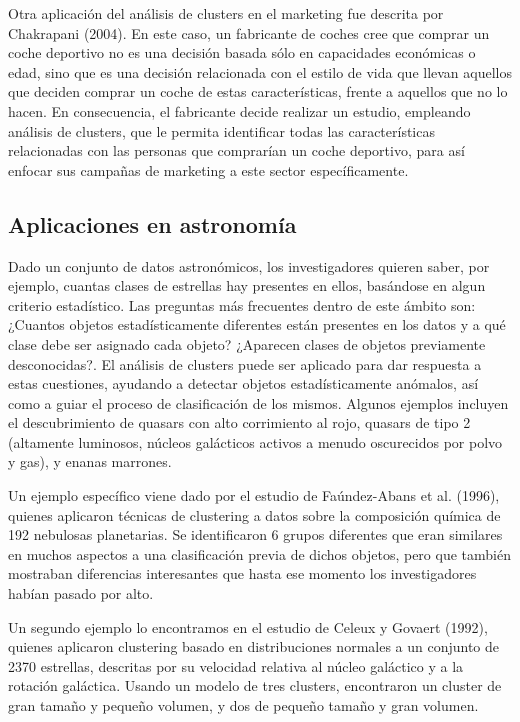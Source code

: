 Otra aplicación del análisis de clusters en el marketing fue descrita por Chakrapani (2004). En este caso, un fabricante de coches cree que comprar un coche deportivo no es una decisión basada sólo en capacidades económicas o edad, sino que es una decisión relacionada con el estilo de vida que llevan aquellos que deciden comprar un coche de estas características, frente a aquellos que no lo hacen. En consecuencia, el fabricante decide realizar un estudio, empleando análisis de clusters, que le permita identificar todas las características relacionadas con las personas que comprarían un coche deportivo, para así enfocar sus campañas de marketing a este sector específicamente.

\subsection{Aplicaciones en astronomía}

Dado un conjunto de datos astronómicos, los investigadores quieren saber, por ejemplo, cuantas clases de estrellas hay presentes en ellos, basándose en algun criterio estadístico. Las preguntas más frecuentes dentro de este ámbito son: ¿Cuantos objetos estadísticamente diferentes están presentes en los datos y a qué clase debe ser asignado cada objeto? ¿Aparecen clases de objetos previamente desconocidas?. El análisis de clusters puede ser aplicado para dar respuesta a estas cuestiones, ayudando a detectar objetos estadísticamente anómalos, así como a guiar el proceso de clasificación de los mismos. Algunos ejemplos incluyen el descubrimiento de quasars con alto corrimiento al rojo, quasars de tipo 2 (altamente luminosos, núcleos galácticos activos a menudo oscurecidos por polvo y gas), y enanas marrones.

Un ejemplo específico viene dado por el estudio de Faúndez-Abans et al. (1996), quienes aplicaron técnicas de clustering a datos sobre la composición química de 192 nebulosas planetarias. Se identificaron 6 grupos diferentes que eran similares en muchos aspectos a una clasificación previa de dichos objetos, pero que también mostraban diferencias interesantes que hasta ese momento los investigadores habían pasado por alto.

Un segundo ejemplo lo encontramos en el estudio de Celeux y Govaert (1992), quienes aplicaron clustering basado en distribuciones normales a un conjunto de 2370 estrellas, descritas por su velocidad relativa al núcleo galáctico y a la rotación galáctica. Usando un modelo de tres clusters, encontraron un cluster de gran tamaño y pequeño volumen, y dos de pequeño tamaño y gran volumen.

